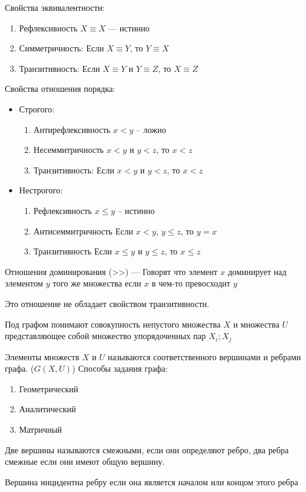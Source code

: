 \documentclass{article}
\begin{document}
Свойства эквивалентности:
\begin{enumerate}
	\item Рефлексивность $X \equiv X$ --- истинно
	\item Симметричность: Если $X \equiv Y$, то $Y \equiv X$
	\item Транзитивность: Если $X \equiv Y$ и $Y \equiv Z$, то $X \equiv Z$
\end{enumerate}
Свойства отношения порядка:
\begin{itemize}
	\item Строгого:
		\begin{enumerate}
			\item Антирефлексивность $x < y$ -- ложно
			\item Несеммитричность $x < y$ и $y < z$, то $x < z$
			\item Транзитивность: Если $x < y$ и $y < z$, то $x < z$
		\end{enumerate}
	\item Нестрогого:
	\begin{enumerate}
		\item Рефлексивность $x \le y$ -- истинно
		\item Антисеммитричность Если $x < y$, $y \le z$, то $y = x$
		\item Транзитивность Если $x \le y$ и $y \le z$, то $x \le z$
	\end{enumerate}
\end{itemize}
Отношения доминирования (>>) --- Говорят что элемент $x$ доминирует над элементом $y$ того же множества если $x$ в чем-то превосходит $y$

Это отношение не обладает свойством транзитивности.

Под графом понимают совокупность непустого множества $X$ и множества $U$ представляющее собой множество упорядоченных пар ${X_i;X_j}$

Элементы множеств $X$ и $U$ называются соответственного вершинами и ребрами графа. ($G(X,U)$)
Способы задания графа:
\begin{enumerate}
	\item Геометрический
	\item Аналитический
	\item Матричный
\end{enumerate}

Две вершины называются смежными, если они определяют ребро, два ребра смежные если они имеют общую вершину.

Вершина инцидентна ребру если она является началом или концом этого ребра
\end{document}
